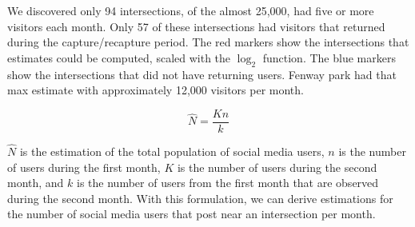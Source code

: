 \documentclass[twocolumn,10pt]{asme2ej}
\begin{document}
We discovered only 94 intersections, of the almost 25,000, had five or more visitors each month. Only 57 of these intersections had visitors that returned during the capture/recapture period. The red markers show the intersections that estimates could be computed, scaled with the $\log_2$ function. The blue markers show the intersections that did not have returning users. Fenway park had that max estimate with approximately 12,000 visitors per month. 


\begin{equation}
\hat{N} = \frac{Kn}{k}
\end{equation} 

$\hat{N}$ is the estimation of the total population of social media users, $n$ is the number of users during the first month, $K$ is the number of users during the second month, and $k$ is the number of users from the first month that are observed during the second month. With this formulation, we can derive estimations for the number of social media users that post near an intersection per month. 
\end{document}
